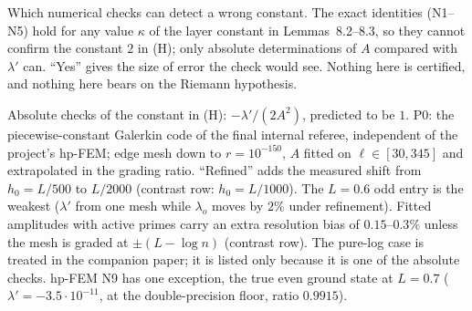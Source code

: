 
\begin{table}[p]\centering\footnotesize\setlength\tabcolsep{3pt}

\caption{Which numerical checks can detect a wrong constant. The exact identities (N1--N5) hold for any value $\kappa$ of the layer constant in Lemmas~8.2--8.3, so they cannot confirm the constant $2$ in (H); only absolute determinations of $A$ compared with $\lambda'$ can. ``Yes'' gives the size of error the check would see. Nothing here is certified, and nothing here bears on the Riemann hypothesis.}\label{tab:detect}
\end{table}

\begin{table}[p]\centering\footnotesize\setlength\tabcolsep{3pt}

\caption{Absolute checks of the constant in (H): $-\lambda'/(2A^2)$, predicted to be $1$. P0: the piecewise-constant Galerkin code of the final internal referee, independent of the project's hp-FEM; edge mesh down to $r=10^{-150}$, $A$ fitted on $\ell\in[30,345]$ and extrapolated in the grading ratio. ``Refined'' adds the measured shift from $h_0=L/500$ to $L/2000$ (contrast row: $h_0=L/1000$). The $L=0.6$ odd entry is the weakest ($\lambda'$ from one mesh while $\lambda_o$ moves by $2\%$ under refinement). Fitted amplitudes with active primes carry an extra resolution bias of $0.15$--$0.3\%$ unless the mesh is graded at $\pm(L-\log n)$ (contrast row). The pure-log case is treated in the companion paper; it is listed only because it is one of the absolute checks. hp-FEM N9 has one exception, the true even ground state at $L=0.7$ ($\lambda'=-3.5\cdot10^{-11}$, at the double-precision floor, ratio $0.9915$).}\label{tab:H}
\end{table}

